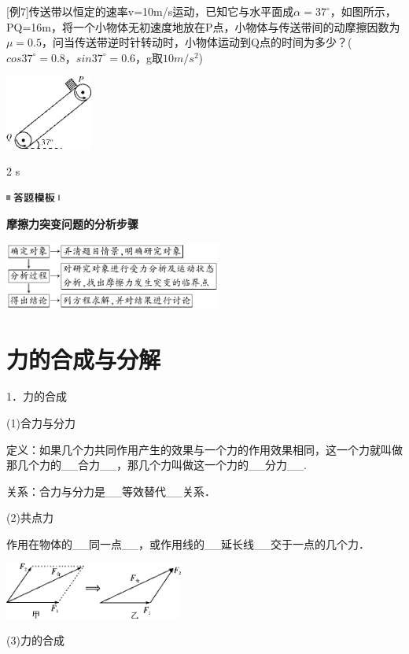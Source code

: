 \documentclass[cn,10.5pt,chinese,mac,chinesefont=founder]{elegantbook}
\begin{document}
{[}例7{]}传送带以恒定的速率v=10m/s运动，已知它与水平面成$\alpha=37^\circ$，如图所示，PQ=16m，将一个小物体无初速度地放在P点，小物体与传送带间的动摩擦因数为$\mu=0.5$，问当传送带逆时针转动时，小物体运动到Q点的时间为多少？($cos37^\circ=0.8，sin 37^\circ=0.6$，g取$10 m/s^2$)

\begin{center}\includegraphics[width=1.125in,height=0.95833in]{media/image53.png}\end{center}

\begin{solution}
	2 s
\end{solution}
\begin{center}\includegraphics[width=0.70833in,height=0.125in]{media/image25.png}

\textbf{摩擦力突变问题的分析步骤}
\end{center}


\begin{center}\includegraphics[width=2.8125in,height=0.875in]{media/image54.png}\end{center}
\newpage
\section{力的合成与分解}


1．力的合成

(1)合力与分力

定义：如果几个力共同作用产生的效果与一个力的作用效果相同，这一个力就叫做那几个力的\_\_合力\_\_，那几个力叫做这一个力的\_\_分力\_\_.

关系：合力与分力是\_\_等效替代\_\_关系．

(2)共点力

作用在物体的\_\_同一点\_\_，或作用线的\_\_延长线\_\_交于一点的几个力．

\begin{center}\includegraphics[width=2.3125in,height=0.72917in]{media/image61.png}
	
\end{center}
(3)力的合成
\end{document}

